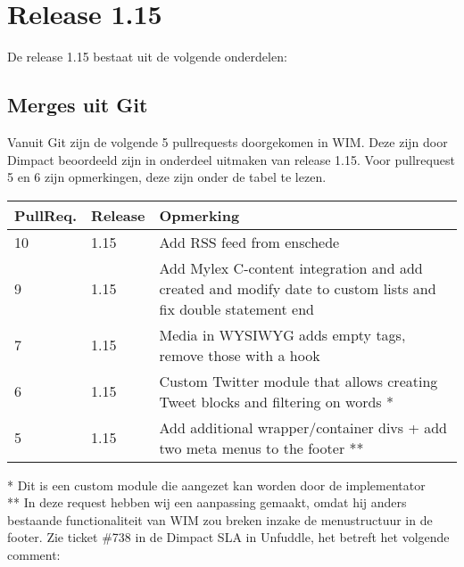 

\newcommand{\projectname}{WIM Release 1.15}

\newcommand{\customer}{Dimpact} %
\newcommand{\customershort}{HK} %

\newcommand{\customerdomain}{bdu.nl}
\newcommand{\authors}{BS Meijer - R Meijer}
\newcommand{\doprep}{BS Meijer - R Meijer}
\newcommand{\customerrep}{J Donkers } %
\newcommand{\offerdate}{11-03-2016}
\newcommand{\leaddate}{10-03-2016 } %
\newcommand{\runtime}{4 weken } %
\newcommand{\lastversion}{1.0}
\newcommand{\lastupdate}{24-03-2016}






\tableofcontents
\pagebreak

\section{Release 1.15}
De release 1.15 bestaat uit de volgende onderdelen:
\subsection{Merges uit Git}
Vanuit Git zijn de volgende 5 pullrequests doorgekomen in WIM. Deze zijn door Dimpact beoordeeld zijn in onderdeel uitmaken van release 1.15. Voor pullrequest 5 en 6 zijn opmerkingen, deze zijn onder de tabel te lezen.

\begin{tabularx}{\linewidth}{l|l|X} \hline
PullReq. & Release & Opmerking \\ \hline
10 & 1.15 & Add RSS feed from enschede \\ \hline
9 & 1.15 & Add Mylex C-content integration and add created and modify date to custom lists
and fix double statement end \\ \hline
7 & 1.15 & Media in WYSIWYG adds empty tags, remove those with a hook \\ \hline
6 & 1.15 & Custom Twitter module that allows creating Tweet blocks and filtering on words * \\ \hline
5 & 1.15 & Add additional wrapper/container divs + add two meta menus to the footer ** \\ \hline
\end{tabularx}

* Dit is een custom module die aangezet kan worden door de implementator \\
** In deze request hebben wij een aanpassing gemaakt, omdat hij anders bestaande functionaliteit van WIM zou breken inzake de menustructuur in de footer. Zie ticket \#738 in de Dimpact SLA in Unfuddle, het betreft het volgende comment:

